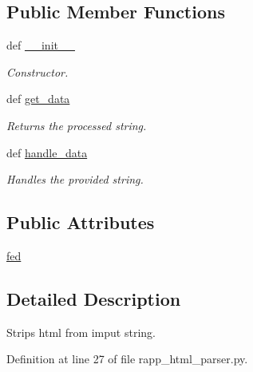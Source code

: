 \subsection*{Public Member Functions}
\begin{DoxyCompactItemize}
\item 
def \hyperlink{classsrc_1_1rapp__html__parser_1_1RappHTMLParser_aadfa387425712cb3709a8439d473975d}{\-\_\-\-\_\-init\-\_\-\-\_\-}
\begin{DoxyCompactList}\small\item\em Constructor. \end{DoxyCompactList}\item 
def \hyperlink{classsrc_1_1rapp__html__parser_1_1RappHTMLParser_a3a5349eadb1fdb4743689bd5ad34a7de}{get\-\_\-data}
\begin{DoxyCompactList}\small\item\em Returns the processed string. \end{DoxyCompactList}\item 
def \hyperlink{classsrc_1_1rapp__html__parser_1_1RappHTMLParser_a33c8a5c0194ac861cecea6e1f230ebad}{handle\-\_\-data}
\begin{DoxyCompactList}\small\item\em Handles the provided string. \end{DoxyCompactList}\end{DoxyCompactItemize}
\subsection*{Public Attributes}
\begin{DoxyCompactItemize}
\item 
\hyperlink{classsrc_1_1rapp__html__parser_1_1RappHTMLParser_a6abbf2287a18d8aeb9bbc8da86453010}{fed}
\end{DoxyCompactItemize}


\subsection{Detailed Description}
Strips html from imput string. 

Definition at line 27 of file rapp\-\_\-html\-\_\-parser.\-py.



